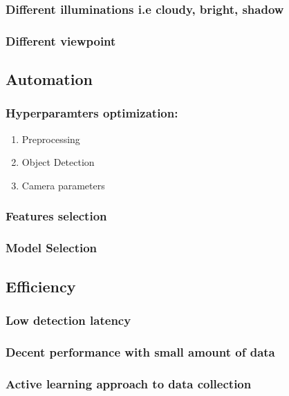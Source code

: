 \documentclass[11pt]{article}
\begin{document}
\subsubsection{Different illuminations i.e cloudy, bright, shadow}
\label{sec:orgd48aa62}
\subsubsection{Different viewpoint}
\label{sec:org2191073}
\subsection{Automation}
\label{sec:orgd18eca5}
\subsubsection{Hyperparamters optimization:}
\label{sec:org8aa9cb5}
\begin{enumerate}
\item Preprocessing
\label{sec:org188af79}
\item Object Detection
\label{sec:orgd1e02f7}
\item Camera parameters
\label{sec:org5b3e168}
\end{enumerate}
\subsubsection{Features selection}
\label{sec:orgbc1c694}
\subsubsection{Model Selection}
\label{sec:orge9a6585}
\subsection{Efficiency}
\label{sec:orgdbc366f}
\subsubsection{Low detection latency}
\label{sec:org1d482a3}
\subsubsection{Decent performance with small amount of data}
\label{sec:orgb02590a}
\subsubsection{Active learning approach to data collection}
\label{sec:orgeed8acf}
\end{document}
